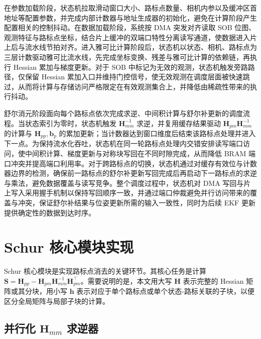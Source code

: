 在参数加载阶段，状态机拉取滑动窗口大小、路标点数量、相机内参以及缓冲区首地址等配置参数，并完成内部计数器与地址生成器的初始化，避免在计算阶段产生配置相关的控制抖动。在数据加载阶段，系统按 DMA 突发对齐读取 SOB 位图、观测特征与路标点坐标，结合片上缓冲的双端口特性分离读写通道，使数据进入片上后与流水线节拍对齐。进入雅可比计算阶段后，状态机以状态、相机、路标点为三层计数驱动雅可比流水线，先完成坐标变换、残差与雅可比计算的依赖链，再执行 Hessian 累加与梯度更新。对于 SOB 中标记为无效的观测，状态机触发旁路路径，仅保留 Hessian 累加入口并维持门控信号，使无效观测在调度层面被快速跳过，从而将计算与存储访问严格限定在有效观测集合上，并降低由稀疏性带来的执行抖动。

舒尔消元阶段面向每个路标点依次完成求逆、中间积计算与舒尔补更新的调度流程。当状态索引为零时，状态机触发 $\mathbf{H}_{mm}^{-1}$ 求逆，并复用缓存结果驱动 $\mathbf{H}_{pm}\mathbf{H}_{mm}^{-1}$ 的计算与 $\mathbf{H}_{pp},\mathbf{b}_p$ 的累加更新；当计数器达到窗口维度后结束该路标点处理并进入下一点。为保持流水化吞吐，状态机在同一轮路标点处理内交错安排读写端口访问，使中间积计算、梯度更新与对称块写回在不同时隙完成，从而降低 BRAM 端口冲突并提高端口利用率。对于跨路标点的切换，状态机通过对缓存有效位与计数器边界的检测，确保前一路标点的舒尔补更新写回完成后再启动下一路标点的求逆与乘法，避免数据覆盖与读写竞争。整个调度过程中，状态机对 DMA 写回与片上写入采用握手机制以保持写回顺序一致，并通过端口仲裁避免并行访问带来的覆盖与冲突，保证舒尔补结果与位姿更新所需的输入一致性，同时为后续 EKF 更新提供确定性的数据到达时序。


\section{Schur 核心模块实现}

Schur 核心模块是实现路标点消去的关键环节。其核心任务是计算 $\mathbf{S} = \mathbf{H}_{pp} - \mathbf{H}_{pm}\mathbf{H}_{mm}^{-1}\mathbf{H}_{pm}^{\top}$。需要说明的是，本文用大写 $\mathbf{H}$ 表示完整的 Hessian 矩阵或其分块，用小写 $\mathbf{h}$ 表示对应于单个路标点或单个状态-路标关联的子块，以便区分全局矩阵与局部子块的计算。

\subsection{并行化 $\mathbf{H}_{mm}$ 求逆器}

